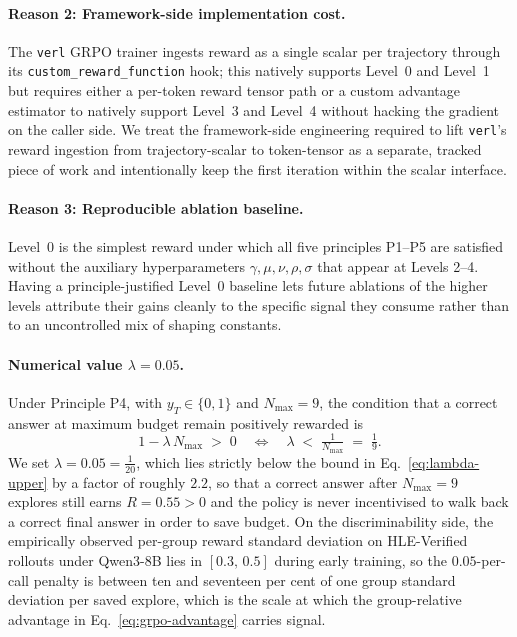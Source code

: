 \paragraph{Reason 2: Framework-side implementation cost.}
The \texttt{verl} GRPO trainer ingests reward as a single scalar per trajectory through its \texttt{custom\_reward\_function} hook; this natively supports Level~0 and Level~1 but requires either a per-token reward tensor path or a custom advantage estimator to natively support Level~3 and Level~4 without hacking the gradient on the caller side. We treat the framework-side engineering required to lift \texttt{verl}'s reward ingestion from trajectory-scalar to token-tensor as a separate, tracked piece of work and intentionally keep the first iteration within the scalar interface.

\paragraph{Reason 3: Reproducible ablation baseline.}
Level~0 is the simplest reward under which all five principles P1--P5 are satisfied without the auxiliary hyperparameters $\gamma, \mu, \nu, \rho, \sigma$ that appear at Levels 2--4. Having a principle-justified Level~0 baseline lets future ablations of the higher levels attribute their gains cleanly to the specific signal they consume rather than to an uncontrolled mix of shaping constants.

\paragraph{Numerical value $\lambda = 0.05$.}
Under Principle P4, with $y_T \in \{0,1\}$ and $N_{\max} = 9$, the condition that a correct answer at maximum budget remain positively rewarded is
\begin{equation}
1 - \lambda\,N_{\max} \;>\; 0 \quad\Longleftrightarrow\quad \lambda \;<\; \tfrac{1}{N_{\max}} \;=\; \tfrac{1}{9}.
\label{eq:lambda-upper}
\end{equation}
We set $\lambda = 0.05 = \tfrac{1}{20}$, which lies strictly below the bound in Eq.~\eqref{eq:lambda-upper} by a factor of roughly $2.2$, so that a correct answer after $N_{\max}=9$ explores still earns $R = 0.55 > 0$ and the policy is never incentivised to walk back a correct final answer in order to save budget. On the discriminability side, the empirically observed per-group reward standard deviation on HLE-Verified rollouts under Qwen3-8B lies in $[0.3,\,0.5]$ during early training, so the $0.05$-per-call penalty is between ten and seventeen per cent of one group standard deviation per saved explore, which is the scale at which the group-relative advantage in Eq.~\eqref{eq:grpo-advantage} carries signal.

